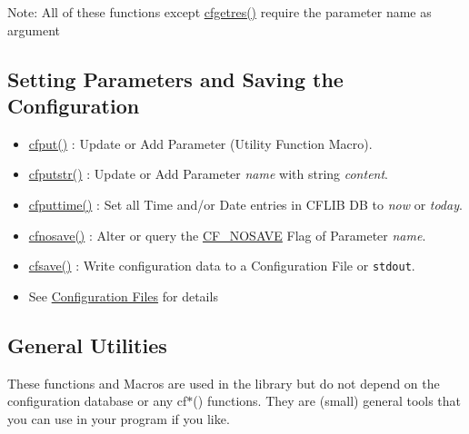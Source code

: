 \begin{Desc}
\item[Note:]All of these functions except \hyperlink{group__retrieval_g6ef6076e946383ab198ee26b9aa5603a}{cfgetres()} require the parameter name as argument\end{Desc}
\hypertarget{index_set_save}{}\subsection{Setting Parameters and Saving the Configuration}\label{index_set_save}
\begin{itemize}
\item \hyperlink{cf_8h_b4370bac1e151641bfb78e65f8ec4b44}{cfput()} : Update or Add Parameter (Utility Function Macro). \item \hyperlink{group__setting__saving_g9553f7a24b080660793a560c2bc8f210}{cfputstr()} : Update or Add Parameter {\em name\/} with string {\em content\/}. \item \hyperlink{group__setting__saving_g6f133f88dc253a6a80d13eed4d123063}{cfputtime()} : Set all Time and/or Date entries in CFLIB DB to {\em now\/} or {\em today\/}. \item \hyperlink{group__setting__saving_g0f6ed90e3ecfa0074af1635a0e4339ef}{cfnosave()} : Alter or query the \hyperlink{group__special__options__mask_gd76153c65f68cc0ee5c1a04c8c3e80bf}{CF\_\-NOSAVE} Flag of Parameter {\em name\/}. \item \hyperlink{group__setting__saving_g046d8a68eae35b987eacca04a9a06cca}{cfsave()} : Write configuration data to a Configuration File or {\tt stdout}. \end{itemize}


\begin{itemize}
\item See \hyperlink{config_files}{Configuration Files} for details\end{itemize}
\hypertarget{index_general_utilities}{}\subsection{General Utilities}\label{index_general_utilities}
These functions and Macros are used in the library but do not depend on the configuration database or any cf$\ast$() functions. They are (small) general tools that you can use in your program if you like.

